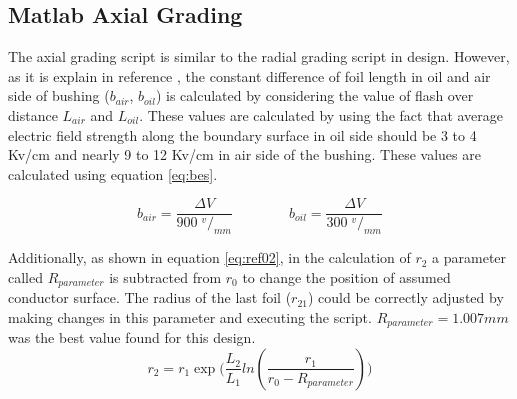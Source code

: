 



\subsection{Matlab Axial Grading}
The axial grading script is similar to the radial grading script in design. 
However, as it is explain in reference \cite{David1}, the constant difference of foil length in oil and air side of bushing ($b_{air}$, $b_{oil}$) is calculated by considering the value of flash over distance $L_{air}$ and $L_{oil}$. 
These values are calculated by using the fact that average electric field strength along the boundary surface in oil side should be 3 to 4 Kv/cm and nearly 9 to 12 Kv/cm  in air side of the bushing. 
These values are calculated using equation \ref{eq:bes}. 
 
\begin{equation}
\label{eq:bes}
 b_{air} = \displaystyle \frac{  \Delta V}{900 \;^v/_{mm}} \qquad \qquad
 b_{oil} = \displaystyle \frac{  \Delta V}{300 \;^v/_{mm}}
\end{equation}

Additionally, as shown in equation \ref{eq:ref02}, in the calculation of $r_2$ a parameter called $R_{parameter}$ is subtracted from $r_0$  to change the position of assumed conductor surface. 
The radius of the last foil ($r_{21}$) could be correctly adjusted by making changes in this parameter and executing the script. $R_{parameter}=1.007mm$ was the best value found for this design.
\begin{equation}
  \label{eq:ref02}
  \displaystyle r_2= \displaystyle  r_{1} \displaystyle \exp\big( \displaystyle  \frac{L_2}{L_{1}}ln(\displaystyle \frac{r_1}{r_0-R_{parameter}})\big) 
\end{equation}

